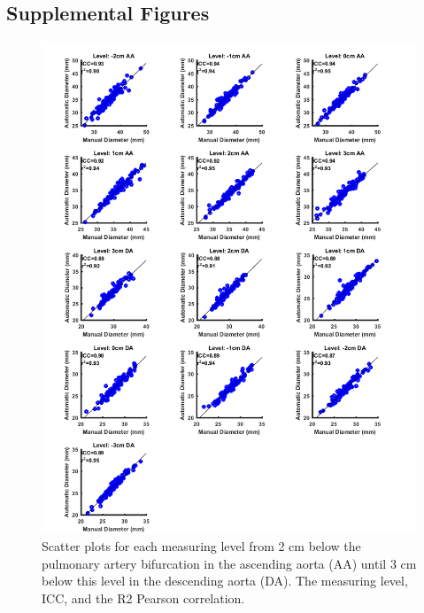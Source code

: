 \newpage
\begin{subappendices}
    \section{Supplemental Figures}

    \begin{figure}[htb]
        \centering
        \includegraphics[width=\textwidth]{Figures/Supplemental figure 1.jpg}
        \caption{Scatter plots for each measuring level from 2 cm below the pulmonary artery bifurcation in the ascending aorta (AA) until 3 cm below this level in the descending aorta (DA). The measuring level, ICC, and the R2 Pearson correlation.}\label{fig:Supplimentary_S1}
    \end{figure}

\end{subappendices}
